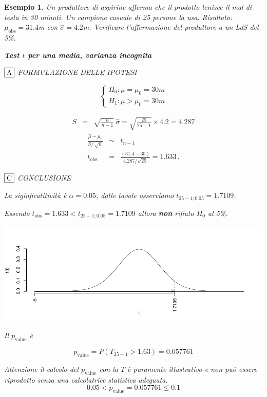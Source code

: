 \documentclass[
  11pt,
]{book}
\theoremstyle{mytheoremstyle}
\theoremstyle{mydefstyle}
\newtheorem{example}{{Esempio}}[section]
\begin{document}
\begin{example}
Un produttore di aspirine afferma che il prodotto lenisce il mal di
testa in 30 minuti. Un campione casuale di 25 persone la usa. Risultato:
\(\mu_\text{obs}=31.4\)m con \(\hat{\sigma}= 4.2\)m. Verificare l'affermazione del
produttore a un LdS del 5\%.

\textbf{Test \(t\) per una media, varianza incognita}

\(\fbox{A}\) FORMULAZIONE DELLE IPOTESI

\[\begin{cases}
   H_0: \mu = \mu_0=30m \\
   H_1: \mu > \mu_0=30m 
   \end{cases}\]

\begin{eqnarray*}
   S    &=& \sqrt{\frac{n} {n-1}}\ \widehat{\sigma} 
   =  \sqrt{\frac{ 25 } { 25 -1}} \times  4.2  =  4.287 
   \end{eqnarray*}
\begin{eqnarray*}
   \frac{\hat\mu - \mu_{0}} {S/\,\sqrt{n}}&\sim&t_{n-1}\\
   t_{\text{obs}}
   &=& \frac{ ( 31.4 -  30 )} { 4.287 /\sqrt{ 25 }}
   =   1.633 \, .
   \end{eqnarray*}

\(\fbox{C}\) CONCLUSIONE

La siginficatitività è \(\alpha=0.05\), dalle tavole osserviamo \(t_{25-1;0.05}=1.7109\).

Essendo \(t_\text{obs}=1.633<t_{25-1;0.05}=1.7109\) allora \textbf{non} rifiuto \(H_0\) al 5\%.

\begin{center}\includegraphics{Appunti_di_Statistica_2025_files/figure-latex/15-test-mu-pi-5-1} \end{center}

Il \(p_{\text{value}}\) è

\[ p_{\text{value}} = P(T_{25-1}>1.63)=0.057761 \]

Attenzione il calcolo del \(p_\text{value}\) con la \(T\) è puramente illustrativo e non può essere riprodotto senza una calcolatrice statistica adeguata.\[
 0.05 < p_\text{value}= 0.057761 \leq 0.1 
\]
\end{example}
\end{document}

